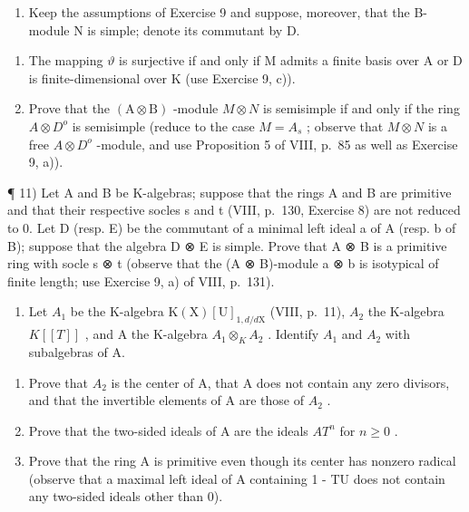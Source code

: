 \begin{enumerate}
\def\labelenumi{\arabic{enumi})}
\setcounter{enumi}{9}
\tightlist
\item
  Keep the assumptions of Exercise 9 and suppose, moreover, that the B-module N is simple; denote its commutant by D.
\end{enumerate}

\begin{enumerate}
\def\labelenumi{\alph{enumi})}
\item
  The mapping \(\vartheta\) is surjective if and only if M admits a finite basis over A or D is finite-dimensional over K (use Exercise 9, c)).
\item
  Prove that the \((\mathrm{A} \otimes \mathrm{B})\) -module \(M \otimes N\) is semisimple if and only if the ring \(A \otimes D^{o}\) is semisimple (reduce to the case \(M = A_{s}\) ; observe that \(M \otimes N\) is a free \(A \otimes D^{o}\) -module, and use Proposition 5 of VIII, p.~85 as well as Exercise 9, a)).
\end{enumerate}

¶ 11) Let A and B be K-algebras; suppose that the rings A and B are primitive and that their respective socles s and t (VIII, p.~130, Exercise 8) are not reduced to 0. Let D (resp. E) be the commutant of a minimal left ideal a of A (resp. b of B); suppose that the algebra D ⊗ E is simple. Prove that A ⊗ B is a primitive ring with socle s ⊗ t (observe that the (A ⊗ B)-module a ⊗ b is isotypical of finite length; use Exercise 9, a) of VIII, p.~131).

\begin{enumerate}
\def\labelenumi{\arabic{enumi})}
\setcounter{enumi}{11}
\tightlist
\item
  Let \(A_{1}\) be the K-algebra \(\mathrm{K}(\mathrm{X})[\mathrm{U}]_{1,d/d\mathrm{X}}\) (VIII, p.~11), \(A_{2}\) the K-algebra \(K[[T]]\) , and A the K-algebra \(A_{1} \otimes_{K} A_{2}\) . Identify \(A_{1}\) and \(A_{2}\) with subalgebras of A.
\end{enumerate}

\begin{enumerate}
\def\labelenumi{\alph{enumi})}
\item
  Prove that \(A_{2}\) is the center of A, that A does not contain any zero divisors, and that the invertible elements of A are those of \(A_{2}\) .
\item
  Prove that the two-sided ideals of A are the ideals \(AT^{n}\) for \(n \geqslant 0\) .
\item
  Prove that the ring A is primitive even though its center has nonzero radical (observe that a maximal left ideal of A containing 1 - TU does not contain any two-sided ideals other than 0).
\end{enumerate}

